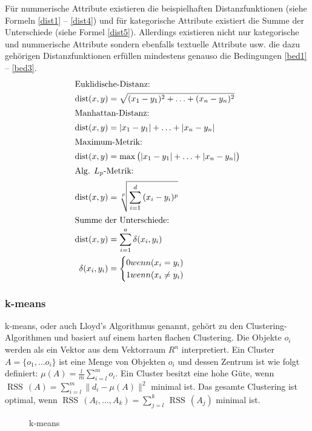 \documentclass[12pt,journal,compsoc]{IEEEtran}
\DeclareMathOperator{\dist}{dist}
\DeclareMathOperator{\RSS}{RSS}
\begin{document}
Für nummerische Attribute existieren die beispielhaften Distanzfunktionen (siehe Formeln \ref{dist1} -- \ref{dist4}) und für 
kategorische Attribute existiert die Summe der Unterschiede (siehe Formel \ref{dist5}). 
Allerdings existieren nicht nur kategorische und nummerische Attribute sondern ebenfalls 
textuelle Attribute usw. die dazu gehörigen Distanzfunktionen erfüllen mindestens genauso die
Bedingungen \ref{bed1} -- \ref{bed3}.
{
\small
\setlength{\belowdisplayskip}{0pt}%
\setlength{\abovedisplayskip}{0pt}%
\begin{align}
\intertext{Euklidische-Distanz:} 
\dist(x,y) &= \sqrt{(x_1 - y_1)^2 + \ldots + (x_n - y_n)^2}\label{dist1}\\
\intertext{Manhattan-Distanz:}
\dist(x,y) &= |x_1 - y_1| + \ldots + |x_n - y_n|\label{dist2}\\
\intertext{Maximum-Metrik:} 
\dist(x,y) &= \max\big(|x_1 - y_1| + \ldots + |x_n - y_n|\big)\label{dist3}\\
\intertext{Alg. $L_p$-Metrik:}
\dist(x,y) &= \sqrt[p]{\sum\limits_{i=1}^{d}{(x_i-y_i)^p}}\label{dist4}\\
\intertext{Summe der Unterschiede:} 
 \dist(x,y) &= \sum\limits_{i=1}^{a}\delta(x_i, y_i)\label{dist5}\\
 \delta(x_i, y_i) &= \begin{cases}
 0 \mbox{ wenn } (x_i = y_i)\\
 1 \mbox{ wenn } (x_i \neq y_i)
 \end{cases} 
 \end{align} 
 }
\subsubsection{k-means} \label{k-means}
 k-means, oder auch Lloyd's Algorithmus genannt, gehört zu den Clustering-Algorithmen und basiert auf 
einem harten flachen Clustering. Die Objekte $o_i$ werden als ein Vektor aus dem 
Vektorraum $R^n$ interpretiert. Ein Cluster $A = \{o_1, \ldots o_i\}$ ist eine Menge
von Objekten $o_i$ und dessen Zentrum ist wie folgt definiert: 
$\mu(A) = \frac{l}{m}\sum\limits_{i=l}^{m}o_i$. Ein Cluster besitzt eine hohe Güte, 
wenn $\RSS\,(A) = \sum\limits_{i=l}^{m}\big\|d_i - \mu(A)\big\|^2$ minimal ist. 
Das gesamte Clustering ist optimal, wenn $\RSS\,(A_l, \ldots, A_k) = \sum\limits_{j=l}^{k}\,\RSS\,(A_j)$ minimal ist. 

\begin{figure}[!t]
\centering
\subfigure[Phase 1 -- 3]{\scalebox{0.5}{}\label{p1-3 k-means}}
\subfigure[Phase 4]{\scalebox{0.5}{}\label{p4 k-means}}
\subfigure[Phase 5]{\scalebox{0.5}{}\label{p5 k-means}}
\subfigure[Phase 6]{\scalebox{0.5}{}\label{p6 k-means}}
\caption{k-means}
\label{k-means 1-6}
\end{figure}
\end{document}

